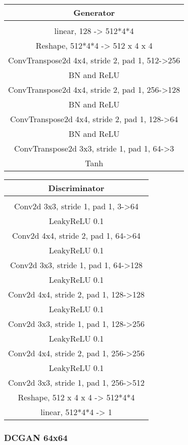 \documentclass{article}
\begin{document}
\begin{tabular}{c}
	Generator \\
	\toprule\midrule
	 \\
	\midrule
	linear, 128 -> 512*4*4 \\
	\midrule
	Reshape, 512*4*4 -> 512 x 4 x 4 \\
	\midrule
	ConvTranspose2d 4x4, stride 2, pad 1, 512->256 \\
	\midrule
	BN and ReLU \\
	\midrule
	ConvTranspose2d 4x4, stride 2, pad 1, 256->128 \\
	\midrule
	BN and ReLU \\
	\midrule
	ConvTranspose2d 4x4, stride 2, pad 1, 128->64 \\
	\midrule
	BN and ReLU \\
	\midrule
	ConvTranspose2d 3x3, stride 1, pad 1, 64->3 \\
	\midrule
	Tanh \\
	\bottomrule
\end{tabular} 
\quad
\begin{tabular}{c}
	Discriminator \\
	\toprule\midrule
	 \\
	\midrule
	Conv2d 3x3, stride 1, pad 1, 3->64 \\
	\midrule
	LeakyReLU 0.1 \\
	\midrule
	Conv2d 4x4, stride 2, pad 1, 64->64 \\
	\midrule
	LeakyReLU 0.1 \\
	\midrule
	Conv2d 3x3, stride 1, pad 1, 64->128 \\
	\midrule
	LeakyReLU 0.1 \\
	\midrule
	Conv2d 4x4, stride 2, pad 1, 128->128 \\
	\midrule
	LeakyReLU 0.1 \\
	\midrule
	Conv2d 3x3, stride 1, pad 1, 128->256 \\
	\midrule
	LeakyReLU 0.1 \\
	\midrule
	Conv2d 4x4, stride 2, pad 1, 256->256 \\
	\midrule
	LeakyReLU 0.1 \\
	\midrule
	Conv2d 3x3, stride 1, pad 1, 256->512 \\
	\midrule
	Reshape, 512 x 4 x 4 -> 512*4*4 \\
	\midrule
	linear, 512*4*4 -> 1 \\
	\bottomrule
\end{tabular}

\subsubsection{DCGAN 64x64}
\end{document}
